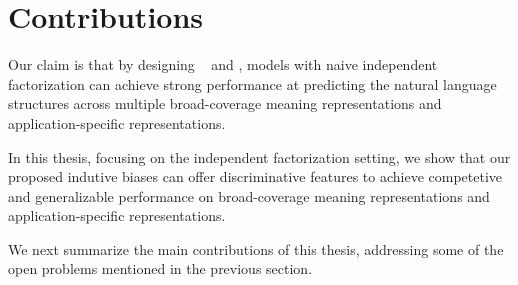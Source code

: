\section{Contributions}
\label{sec:intro-contri}

 Our claim is that by designing
~ and , models with naive independent factorization can achieve
strong performance at predicting the natural language structures
across multiple broad-coverage meaning representations and
application-specific representations.

 In this thesis, focusing on the independent
factorization setting, we show that our proposed indutive biases can
offer discriminative features to achieve competetive and generalizable
performance on broad-coverage meaning representations and
application-specific representations.

We next summarize the main contributions of this thesis, addressing
some of the open problems mentioned in the previous section.

